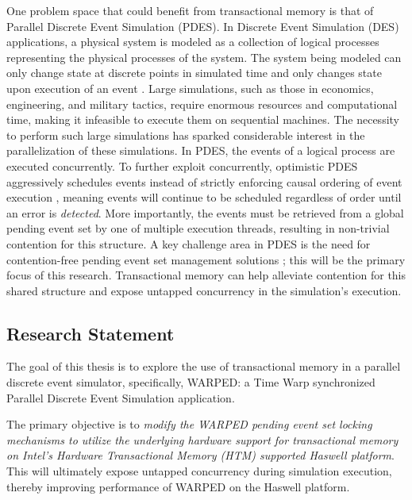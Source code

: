 \documentclass[a4paper]{article}
\begin{document}
\indent 
One problem space that could benefit from transactional memory is that of
Parallel Discrete Event Simulation (PDES).  In Discrete Event Simulation (DES)
applications, a physical system is modeled as a collection of logical processes
representing the physical processes of the system.  The system being modeled can
only change state at discrete points in simulated time and only changes state
upon execution of an event \cite{fujimoto}.  Large simulations, such as those in
economics, engineering, and military tactics, require enormous resources and
computational time, making it infeasible to execute them on sequential machines.
The necessity to perform such large simulations has sparked considerable
interest in the parallelization of these simulations.  In PDES, the events of a
logical process are executed concurrently.  To further exploit concurrently,
optimistic PDES aggressively schedules events instead of strictly enforcing
causal ordering of event execution \cite{fujimoto,dickman_thesis}, meaning
events will continue to be scheduled regardless of order until an error is
\textit{detected}.  More importantly, the events must be retrieved from a global
pending event set by one of multiple execution threads, resulting in non-trivial
contention for this structure.  A key challenge area in PDES is the need for
contention-free pending event set management solutions \cite{dickman}; this will
be the primary focus of this research. Transactional memory can help alleviate contention for this shared structure and
expose untapped concurrency in the simulation's execution.
\par

\subsection{\textbf{Research Statement}}

\indent 
The goal of this thesis is to explore the use of transactional memory in
a parallel discrete event simulator, specifically, WARPED: a Time
Warp synchronized Parallel Discrete Event Simulation application.
\par

\indent
The primary objective is to \textit{modify the WARPED pending event set
    locking mechanisms to utilize the underlying hardware support for
    transactional memory on Intel's Hardware Transactional Memory (HTM)
supported Haswell platform}.  This will ultimately expose untapped concurrency
during simulation execution, thereby improving performance of WARPED on the
Haswell platform.
\par
\end{document}
